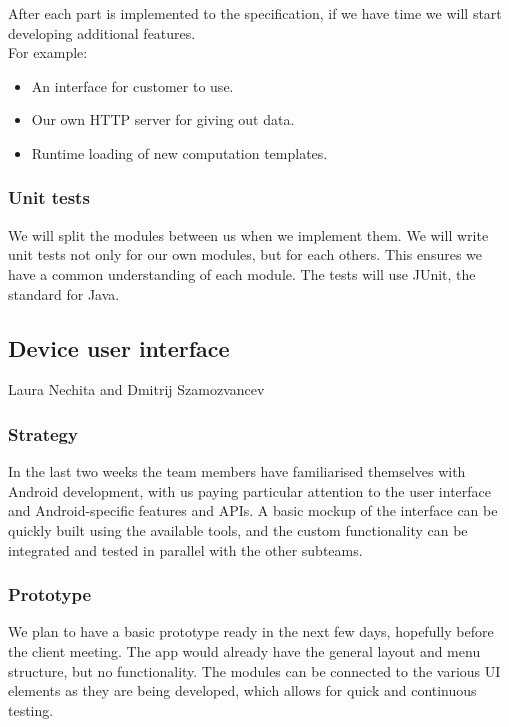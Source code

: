 \documentclass[
  twoside,
  10pt, a4paper
]{article}
\begin{document}
After each part is implemented to the specification, if we have time we will start developing additional features.\\
For example:
\begin{itemize}
\item An interface for customer to use.
\item Our own HTTP server for giving out data.
\item Runtime loading of new computation templates.
\end{itemize}

\subsubsection{Unit tests}

We will split the modules between us when we implement them. We will write unit tests not only for our own modules, but for each others.
This ensures we have a common understanding of each module. The tests will use JUnit, the standard for Java.







\subsection{Device user interface}

Laura Nechita and Dmitrij Szamozvancev

\subsubsection{Strategy} 
In the last two weeks the team members have familiarised themselves with Android development, with us paying particular attention to the user interface and Android-specific features and APIs. A basic mockup of the interface can be quickly built using the available tools, and the custom functionality can be integrated and tested in parallel with the other subteams.

\subsubsection{Prototype}
We plan to have a basic prototype ready in the next few days, hopefully before the client meeting. The app would already have the general layout and menu structure, but no functionality. The modules can be connected to the various UI elements as they are being developed, which allows for quick and continuous testing. 
\end{document}
